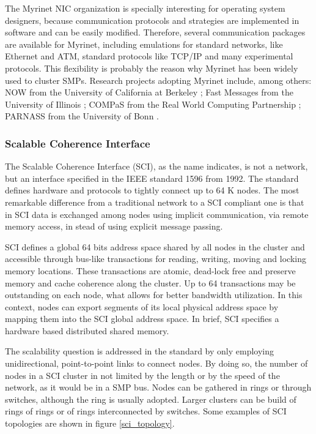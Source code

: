 	The Myrinet NIC organization is specially interesting for operating system designers, because communication protocols and strategies are implemented in software and can be easily modified. Therefore, several communication packages are available for Myrinet, including emulations for standard networks, like Ethernet and ATM, standard protocols like TCP/IP and many experimental protocols. This flexibility is probably the reason why Myrinet has been widely used to cluster SMPs. Research projects adopting Myrinet include, among others: NOW from the University of California at Berkeley \cite{Culler:97}; Fast Messages from the University of Illinois \cite{Pakin:97}; COMPaS from the Real World Computing Partnership \cite{Tanaka:98}; PARNASS from the University of Bonn \cite{Griebel:97}.


\subsubsection{\label{hard_comm_sci}Scalable Coherence Interface}

	The Scalable Coherence Interface (SCI), as the name indicates, is not a network, but an interface specified in the IEEE standard 1596 from 1992. The standard defines hardware and protocols to tightly connect up to 64 K nodes. The most remarkable difference from a traditional network to a SCI compliant one is that in SCI data is exchanged among nodes using implicit communication, via remote memory access, in stead of using explicit message passing.

	SCI defines a global 64 bits address space shared by all nodes in the cluster and accessible through bus-like transactions for reading, writing, moving and locking memory locations. These transactions are atomic, dead-lock free and preserve memory and cache coherence along the cluster. Up to 64 transactions may be outstanding on each node, what allows for better bandwidth utilization. In this context, nodes can export segments of its local physical address space by mapping them into the SCI global address space. In brief, SCI specifies a hardware based distributed shared memory.	
	
	The scalability question is addressed in the standard by only employing unidirectional, point-to-point links to connect nodes. By doing so, the number of nodes in a SCI cluster in not limited by the length or by the speed of the network, as it would be in a SMP bus. Nodes can be gathered in rings or through switches, although the ring is usually adopted. Larger clusters can be build of rings of rings or of rings interconnected by switches. Some examples of SCI topologies are shown in figure \ref{sci_topology}.

